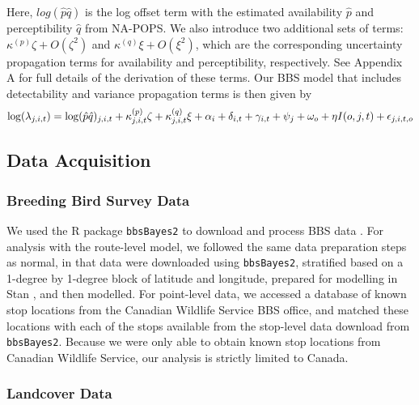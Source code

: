 \documentclass[12pt]{article}
\begin{document}
\par Here, $log(\hat{p} \hat{q})$ is the log offset term with the estimated availability $\hat{p}$ and perceptibility $\hat{q}$ from NA-POPS. 
We also introduce two additional sets of terms: $\kappa^{(p)}\zeta + O(\zeta^2)$ and $\kappa^{(q)}\xi + O(\xi^2)$, which are the corresponding uncertainty propagation terms for availability and perceptibility, respectively.  
See Appendix A for full details of the derivation of these terms.
Our BBS model that includes detectability and variance propagation terms is then given by
\begin{equation}\label{bbs_varprop}
	\log(\lambda_{j,i,t}) = \log(\hat{p} \hat{q})_{j,i,t} + \kappa_{j,i,t}^{(p)}\zeta + \kappa_{j,i,t}^{(q)}\xi + \alpha_i + \delta_{i,t} + \gamma_{i,t} + \psi_j + \omega_o + \eta I(o,j,t) + \epsilon_{j,i,t,o} \\
\end{equation}

\subsection{Data Acquisition}

\subsubsection{Breeding Bird Survey Data}

\par We used the R package \texttt{bbsBayes2} to download and process BBS data \citep{edwards_bbsbayes_2021}. 
For analysis with the route-level model, we followed the same data preparation steps as normal, in that data were downloaded using \texttt{bbsBayes2}, stratified based on a 1-degree by 1-degree block of latitude and longitude, prepared for modelling in Stan \citep{stan_development_team_stan_2024}, and then modelled.
For point-level data, we accessed a database of known stop locations from the Canadian Wildlife Service BBS office, and matched these locations with each of the stops available from the stop-level data download from \texttt{bbsBayes2}.
Because we were only able to obtain known stop locations from Canadian Wildlife Service, our analysis is strictly limited to Canada.

\subsubsection{Landcover Data}
\end{document}
